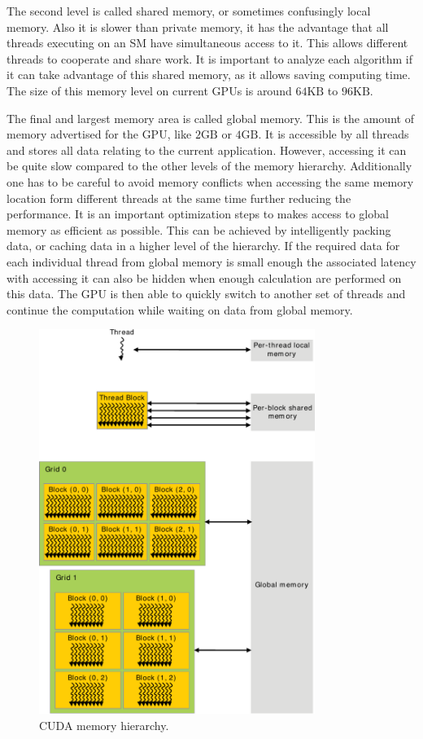 \documentclass[a4paper,11pt]{kth-mag}
\begin{document}
The second level is called shared memory, or sometimes confusingly local memory. Also it is slower than private memory, it has the advantage that all threads executing on an SM have simultaneous access to it. This allows different threads to cooperate and share work. It is important to analyze each algorithm if it can take advantage of this shared memory, as it allows saving computing time. The size of this memory level on current GPUs is around $64\text{KB}$ to $96\text{KB}$.

The final and largest memory area is called global memory. This is the amount of memory advertised for the GPU, like $2\text{GB}$ or $4\text{GB}$. It is accessible by all threads and stores all data relating to the current application. However, accessing it can be quite slow compared to the other levels of the memory hierarchy. Additionally one has to be careful to avoid memory conflicts when accessing the same memory location form different threads at the same time further reducing the performance. It is an important optimization steps to makes access to global memory as efficient as possible. This can be achieved by intelligently packing data, or caching data in a higher level of the hierarchy. If the required data for each individual thread from global memory is small enough the associated latency with accessing it can also be hidden when enough calculation are performed on this data. The GPU is then able to quickly switch to another set of threads and continue the computation while waiting on data from global memory.

\begin{figure}[!htbp]
  \centering
  \includegraphics[width=0.8\textwidth]{img/memory_hierarchy.pdf}
  \caption{CUDA memory hierarchy.}
  \label{fig:memory_hierarchy}
\end{figure}
\end{document}
